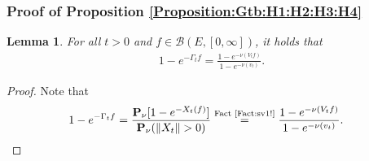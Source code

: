 \documentclass[12pt,a4paper]{amsart}
\numberwithin{equation}{section}
\theoremstyle{plain}
\newtheorem{lem}[thm]{Lemma}
\theoremstyle{definition}
\theoremstyle{remark}
\newcounter{N}
\newcounter{n}[N]
\begin{document}
\subsubsection{Proof of Proposition \ref{Proposition:Gtb:H1:H2:H3:H4}}
\label{sec:Gtb}
\begin{lem} \label{Lemma:Gfnv!}
For all $t > 0$ and $f\in \mathcal B(E,[0,\infty])$, it holds that
\begin{align}
 1 - e^{- \Gamma_t f}
  = \frac{ 1 - e^{- \nu(V_tf)} }{ 1 - e^{- \nu(v_t)}}.
 \end{align}
\end{lem}
\begin{proof}
Note that
\begin{align}
 & 1 - e^{- \Gamma_t f}
  = \frac{ \mathbf P_\nu [ 1 - e^{- X_t(f)}]}{ \mathbf P_\nu (\|X_t\| > 0)}
  \overset{\text{Fact \ref{Fact:sv1!}}}= \frac{ 1 - e^{- \nu(V_tf)} }{ 1 - e^{- \nu(v_t)}}.
  \qedhere
 \end{align}
\end{proof}
\end{document}
